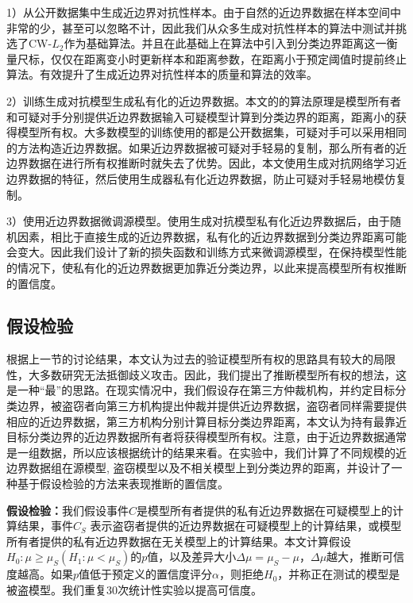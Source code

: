 1）从公开数据集中生成近边界对抗性样本。由于自然的近边界数据在样本空间中非常的少，甚至可以忽略不计，因此我们从众多生成对抗性样本的算法中测试并挑选了CW-$L_2$作为基础算法。并且在此基础上在算法中引入到分类边界距离这一衡量尺标，仅仅在距离变小时更新样本和距离参数，在距离小于预定阈值时提前终止算法。有效提升了生成近边界对抗性样本的质量和算法的效率。

2）训练生成对抗模型生成私有化的近边界数据。本文的的算法原理是模型所有者和可疑对手分别提供近边界数据输入可疑模型计算到分类边界的距离，距离小的获得模型所有权。大多数模型的训练使用的都是公开数据集，可疑对手可以采用相同的方法构造近边界数据。如果近边界数据被可疑对手轻易的复制，那么所有者的近边界数据在进行所有权推断时就失去了优势。因此，本文使用生成对抗网络学习近边界数据的特征，然后使用生成器私有化近边界数据，防止可疑对手轻易地模仿复制。

3）使用近边界数据微调源模型。使用生成对抗模型私有化近边界数据后，由于随机因素，相比于直接生成的近边界数据，私有化的近边界数据到分类边界距离可能会变大。因此我们设计了新的损失函数和训练方式来微调源模型，在保持模型性能的情况下，使私有化的近边界数据更加靠近分类边界，以此来提高模型所有权推断的置信度。

\subsection{假设检验}\label{4.2.3}

根据上一节的讨论结果，本文认为过去的验证模型所有权的思路具有较大的局限性，大多数研究无法抵御歧义攻击。因此，我们提出了推断模型所有权的想法，这是一种“最”的思路。在现实情况中，我们假设存在第三方仲裁机构，并约定目标分类边界，被盗窃者向第三方机构提出仲裁并提供近边界数据，盗窃者同样需要提供相应的近边界数据，第三方机构分别计算目标分类边界距离，本文认为持有最靠近目标分类边界的近边界数据所有者将获得模型所有权。注意，由于近边界数据通常是一组数据，所以应该根据统计的结果来看。在实验中，我们计算了不同规模的近边界数据组在源模型, 盗窃模型以及不相关模型上到分类边界的距离，并设计了一种基于假设检验的方法来表现推断的置信度。

\noindent\textbf{假设检验：}我们假设事件$C$是模型所有者提供的私有近边界数据在可疑模型上的计算结果，事件$C_S$ 表示盗窃者提供的近边界数据在可疑模型上的计算结果，或模型所有者提供的私有近边界数据在无关模型上的计算结果。本文计算假设$H_0:\mu \geq \mu_S(H_1:\mu < \mu_S)$的$p$值，以及差异大小$\Delta \mu = \mu_S - \mu$，$\Delta\mu$越大，推断可信度越高。如果$p$值低于预定义的置信度评分$\alpha$，则拒绝$H_0$，并称正在测试的模型是被盗模型。我们重复30次统计性实验以提高可信度。

